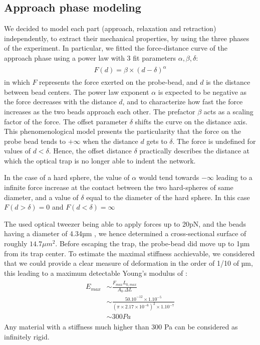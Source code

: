 \documentclass[A4paperpaper,11pt,english]{sphinxmanual}
\begin{document}
\subsection{Approach phase modeling}
\label{parts/part3:approach-phase-modeling}
We
decided to model each part (approach, relaxation and retraction) independently, to extract their mechanical properties, by using the three phases of the experiment.
In particular, we fitted the force-distance curve of the approach phase using a power
law with 3 fit parameters \(\alpha, \beta, \delta\):
\label{parts/part3:equation-eqa31}\begin{gather}
\begin{split}F(d) = \beta \times \left(d-\delta\right)^\alpha\end{split}\label{parts/part3-eqa31}
\end{gather}
in which \(F\) represents the force exerted on the probe-bead, and \(d\)
is the distance between bead centers. The power law exponent \(\alpha\) is
expected to be negative as the force decreases with the distance \(d\), and
to characterize how fast the force increases as the two
beads approach each other. The prefactor \(\beta\) acts as a scaling factor of the
force. The offset parameter \(\delta\) shifts the curve on the distance
axis. This phenomenological model presents the particularity that the force on the probe bead tends to
\(+\infty\) when the distance \(d\) gets  to \(\delta\). The force
is undefined for values of \(d< \delta\). Hence, the offset distance \(\delta\)
practically describes the distance at which the optical trap is no longer able to
indent the network.

In the case of a hard sphere, the value of \(\alpha\) would tend towards
\(-\infty\) leading to a infinite force increase at the contact between the
two hard-spheres of same diameter, and a value of \(\delta\) equal to the
diameter of the hard sphere.  In this case \(F(d>\delta)=0\) and
\(F(d<\delta)=\infty\)

The used optical tweezer being able to apply forces up to 20pN, and the beads
having a diameter of 4.34µm , we hence determined a cross-sectional surface of roughly \(14.7\mu{}m^2\). Before
escaping the trap, the probe-bead did move up to 1µm from its
trap center. To estimate the maximal stiffness acchievable, we considered that we could
provide a clear measure of deformation in the order of 1/10 of µm,  this
leading to a maximum detectable Young's modulus of :
\label{parts/part3:equation-eqa32a}\begin{gather}
\begin{split}E_{max} &\sim \frac{F_{max}L_{0,max}}{A_0.\Delta L} \\
        &\sim \frac{50.10^{-12} \times 1.10^{-5} }{  (\pi\times 2.17\times 10^{-6})^2 \times 1.10^{-7}              }\\
        & \sim 300 Pa\end{split}\label{parts/part3-eqa32a}
\end{gather}
Any material with a stiffness much higher than 300 Pa can be considered as
infinitely rigid.
\end{document}
